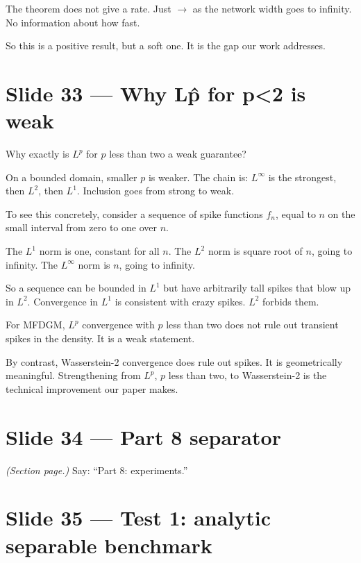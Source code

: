 \documentclass[11pt]{article}
\begin{document}
The theorem does not give a rate. Just $\to$ as the network width goes to
infinity. No information about how fast.

So this is a positive result, but a soft one. It is the gap our work
addresses.

\section*{Slide 33 --- Why L\^p for p<2 is weak}

Why exactly is $L^p$ for $p$ less than two a weak guarantee?

On a bounded domain, smaller $p$ is weaker. The chain is: $L^\infty$ is the
strongest, then $L^2$, then $L^1$. Inclusion goes from strong to weak.

To see this concretely, consider a sequence of spike functions $f_n$, equal
to $n$ on the small interval from zero to one over $n$.

The $L^1$ norm is one, constant for all $n$. The $L^2$ norm is square root
of $n$, going to infinity. The $L^\infty$ norm is $n$, going to infinity.

So a sequence can be bounded in $L^1$ but have arbitrarily tall spikes that
blow up in $L^2$. Convergence in $L^1$ is consistent with crazy spikes.
$L^2$ forbids them.

For MFDGM, $L^p$ convergence with $p$ less than two does not rule out
transient spikes in the density. It is a weak statement.

By contrast, Wasserstein-2 convergence does rule out spikes. It is
geometrically meaningful. Strengthening from $L^p$, $p$ less than two, to
Wasserstein-2 is the technical improvement our paper makes.

\section*{Slide 34 --- Part 8 separator}

\textit{(Section page.)}  Say: ``Part 8: experiments.''

\section*{Slide 35 --- Test 1: analytic separable benchmark}
\end{document}
